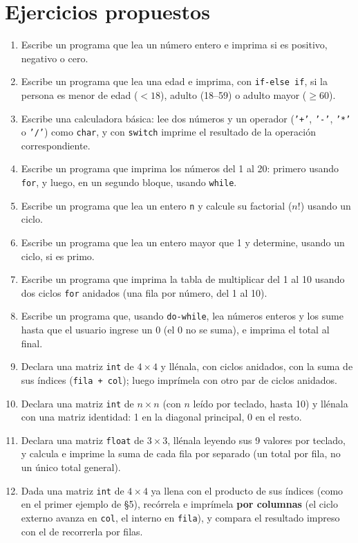 \documentclass[11pt,letterpaper]{article}
\theoremstyle{definition}
\begin{document}
\section{Ejercicios propuestos}

\begin{enumerate}[leftmargin=1.2cm]
  \item Escribe un programa que lea un número entero e imprima si es positivo, negativo o cero.
  \item Escribe un programa que lea una edad e imprima, con \texttt{if-else if}, si la persona es
        menor de edad ($< 18$), adulto (18--59) o adulto mayor ($\geq 60$).
  \item Escribe una calculadora básica: lee dos números y un operador (\texttt{'+'}, \texttt{'-'},
        \texttt{'*'} o \texttt{'/'}) como \texttt{char}, y con \texttt{switch} imprime el resultado
        de la operación correspondiente.
  \item Escribe un programa que imprima los números del 1 al 20: primero usando \texttt{for}, y
        luego, en un segundo bloque, usando \texttt{while}.
  \item Escribe un programa que lea un entero \texttt{n} y calcule su factorial ($n!$) usando un
        ciclo.
  \item Escribe un programa que lea un entero mayor que 1 y determine, usando un ciclo, si es
        primo.
  \item Escribe un programa que imprima la tabla de multiplicar del 1 al 10 usando dos ciclos
        \texttt{for} anidados (una fila por número, del 1 al 10).
  \item Escribe un programa que, usando \texttt{do-while}, lea números enteros y los sume hasta que
        el usuario ingrese un $0$ (el $0$ no se suma), e imprima el total al final.
  \item Declara una matriz \texttt{int} de $4\times4$ y llénala, con ciclos anidados, con la suma
        de sus índices (\texttt{fila + col}); luego imprímela con otro par de ciclos anidados.
  \item Declara una matriz \texttt{int} de $n\times n$ (con $n$ leído por teclado, hasta 10) y
        llénala con una matriz identidad: 1 en la diagonal principal, 0 en el resto.
  \item Declara una matriz \texttt{float} de $3\times3$, llénala leyendo sus 9 valores por teclado,
        y calcula e imprime la suma de cada fila por separado (un total por fila, no un único total
        general).
  \item Dada una matriz \texttt{int} de $4\times4$ ya llena con el producto de sus índices (como en
        el primer ejemplo de \S 5), recórrela e imprímela \textbf{por columnas} (el ciclo externo
        avanza en \texttt{col}, el interno en \texttt{fila}), y compara el resultado impreso con el
        de recorrerla por filas.
\end{enumerate}
\end{document}
